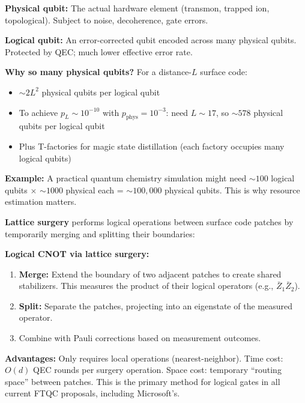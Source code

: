 \documentclass[11pt,a4paper]{article}
\begin{document}
\begin{answerbox}
\textbf{Physical qubit:} The actual hardware element (transmon, trapped ion, topological). Subject to noise, decoherence, gate errors.

\textbf{Logical qubit:} An error-corrected qubit encoded across many physical qubits. Protected by QEC; much lower effective error rate.

\textbf{Why so many physical qubits?} For a distance-$L$ surface code:
\begin{itemize}
    \item $\sim 2L^2$ physical qubits per logical qubit
    \item To achieve $p_L \sim 10^{-10}$ with $p_{\text{phys}} = 10^{-3}$: need $L \sim 17$, so $\sim 578$ physical qubits per logical qubit
    \item Plus T-factories for magic state distillation (each factory occupies many logical qubits)
\end{itemize}
\textbf{Example:} A practical quantum chemistry simulation might need $\sim 100$ logical qubits $\times$ $\sim 1000$ physical each = $\sim 100{,}000$ physical qubits. This is why resource estimation matters.
\end{answerbox}

\begin{answerbox}
\textbf{Lattice surgery} performs logical operations between surface code patches by temporarily merging and splitting their boundaries:

\textbf{Logical CNOT via lattice surgery:}
\begin{enumerate}
    \item \textbf{Merge:} Extend the boundary of two adjacent patches to create shared stabilizers. This measures the product of their logical operators (e.g., $\bar{Z}_1 \bar{Z}_2$).
    \item \textbf{Split:} Separate the patches, projecting into an eigenstate of the measured operator.
    \item Combine with Pauli corrections based on measurement outcomes.
\end{enumerate}
\textbf{Advantages:} Only requires local operations (nearest-neighbor). Time cost: $O(d)$ QEC rounds per surgery operation. Space cost: temporary ``routing space'' between patches. This is the primary method for logical gates in all current FTQC proposals, including Microsoft's.
\end{answerbox}
\end{document}
